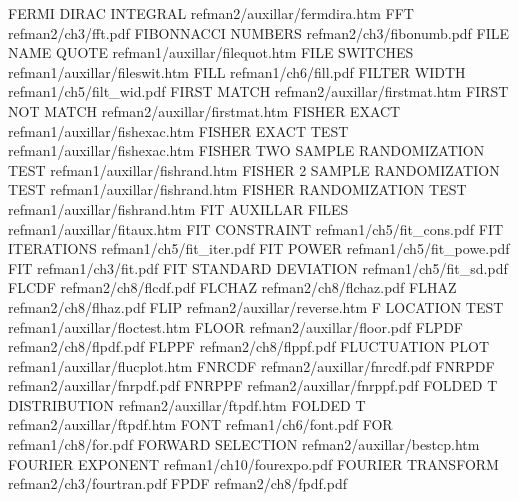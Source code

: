FERMI DIRAC INTEGRAL                    refman2/auxillar/fermdira.htm
FFT                                     refman2/ch3/fft.pdf
FIBONNACCI NUMBERS                      refman2/ch3/fibonumb.pdf
FILE NAME QUOTE                         refman1/auxillar/filequot.htm
FILE SWITCHES                           refman1/auxillar/fileswit.htm
FILL                                    refman1/ch6/fill.pdf
FILTER WIDTH                            refman1/ch5/filt_wid.pdf
FIRST MATCH                             refman2/auxillar/firstmat.htm
FIRST NOT MATCH                         refman2/auxillar/firstmat.htm
FISHER EXACT                            refman1/auxillar/fishexac.htm
FISHER EXACT TEST                       refman1/auxillar/fishexac.htm
FISHER TWO SAMPLE RANDOMIZATION TEST    refman1/auxillar/fishrand.htm
FISHER 2 SAMPLE RANDOMIZATION TEST      refman1/auxillar/fishrand.htm
FISHER RANDOMIZATION TEST               refman1/auxillar/fishrand.htm
FIT AUXILLAR FILES                      refman1/auxillar/fitaux.htm
FIT CONSTRAINT                          refman1/ch5/fit_cons.pdf
FIT ITERATIONS                          refman1/ch5/fit_iter.pdf
FIT POWER                               refman1/ch5/fit_powe.pdf
FIT                                     refman1/ch3/fit.pdf
FIT STANDARD DEVIATION                  refman1/ch5/fit_sd.pdf
FLCDF                                   refman2/ch8/flcdf.pdf
FLCHAZ                                  refman2/ch8/flchaz.pdf
FLHAZ                                   refman2/ch8/flhaz.pdf
FLIP                                    refman2/auxillar/reverse.htm
F LOCATION TEST                         refman1/auxillar/floctest.htm
FLOOR                                   refman2/auxillar/floor.pdf
FLPDF                                   refman2/ch8/flpdf.pdf
FLPPF                                   refman2/ch8/flppf.pdf
FLUCTUATION PLOT                        refman1/auxillar/flucplot.htm
FNRCDF                                  refman2/auxillar/fnrcdf.pdf
FNRPDF                                  refman2/auxillar/fnrpdf.pdf
FNRPPF                                  refman2/auxillar/fnrppf.pdf
FOLDED T DISTRIBUTION                   refman2/auxillar/ftpdf.htm
FOLDED T                                refman2/auxillar/ftpdf.htm
FONT                                    refman1/ch6/font.pdf
FOR                                     refman1/ch8/for.pdf
FORWARD SELECTION                       refman2/auxillar/bestcp.htm
FOURIER EXPONENT                        refman1/ch10/fourexpo.pdf
FOURIER TRANSFORM                       refman2/ch3/fourtran.pdf
FPDF                                    refman2/ch8/fpdf.pdf
